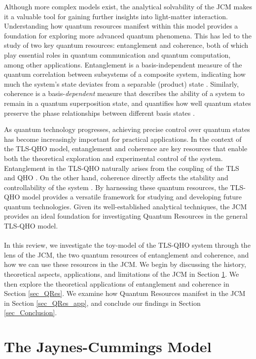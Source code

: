 \documentclass[12pt,a4paper]{article}
\begin{document}
Although more complex models exist, the analytical solvability of the JCM makes it a valuable tool for gaining further insights into light-matter interaction. Understanding how quantum resources manifest within this model provides a foundation for exploring more advanced quantum phenomena. This has led to the study of two key quantum resources: entanglement and coherence, both of which play essential roles in quantum communication and quantum computation, among other applications. Entanglement is a basis-independent measure of the quantum correlation between subsystems of a composite system, indicating how much the system's state deviates from a separable (product) state \cite{Entanglement2009-Definition}. Similarly, coherence is a basis-\textit{dependent} measure that describes the ability of a system to remain in a quantum superposition state, and quantifies how well quantum states preserve the phase relationships between different basis states \cite{Coherence2017-Colloquium}. 

As quantum technology progresses, achieving precise control over quantum states has become increasingly important for practical applications. In the context of the TLS-QHO model, entanglement and coherence are key resources that enable both the theoretical exploration and experimental control of the system. Entanglement in the TLS-QHO naturally arises from the coupling of the TLS and QHO \cite{Entanglement2009-REE_VNapplied}. On the other hand, coherence directly affects the stability and controllability of the system \cite{Coherence2020-JCMapplied}.  By harnessing these quantum resources, the TLS-QHO model provides a versatile framework for studying and developing future quantum technologies. Given its well-established analytical techniques, the JCM provides an ideal foundation for investigating Quantum Resources in the general TLS-QHO model.  \\
\\
In this review, we investigate the toy-model of the TLS-QHO system through the lens of the JCM, the two quantum resources of entanglement and coherence, and how we can use these resources in the JCM. We begin by discussing the history, theoretical aspects, applications, and limitations of the JCM in Section \ref{sec_TLS-QHO}. We then explore the theoretical applications of entanglement and coherence in Section \ref{sec_QRes}. We examine how Quantum Resources manifest in the JCM in Section \ref{sec_QRes_app}, and conclude our findings in Section \ref{sec_Conclusion}.

\section{The Jaynes-Cummings Model} \label{sec_TLS-QHO}
\end{document}
